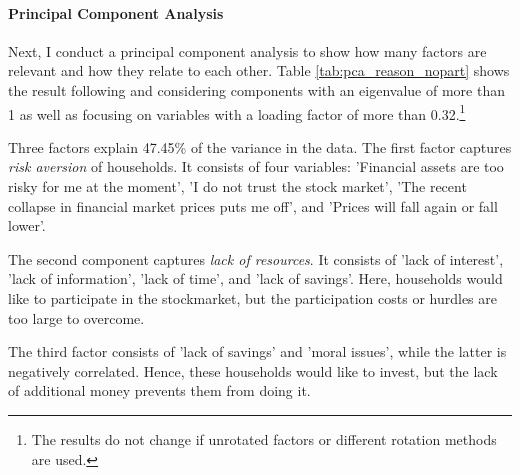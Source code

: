 \documentclass[ProjectABM]{subfiles}
\begin{document}


\paragraph{Principal Component Analysis}

Next, I conduct a principal component analysis to show how many factors are relevant and how they relate to each other. Table \ref{tab:pca_reason_nopart} shows the result following \cite{choi_2020} and\cite{tabachnick_fidell_2007} considering components with an eigenvalue of more than 1 as well as focusing on variables with a loading factor of more than 0.32.\footnote{The results do not change if unrotated factors or different rotation methods are used.}

Three factors explain 47.45\% of the variance in the data. The first factor captures \textit{risk aversion} of households. It consists of four variables: 'Financial assets are too risky for me at the moment', 'I do not trust the stock market', 'The recent collapse in financial market prices puts me off', and 'Prices will fall again or fall lower'. 

The second component captures \textit{lack of resources}. It consists of 'lack of interest', 'lack of information', 'lack of time', and 'lack of savings'. Here, households would like to participate in the stockmarket, but the participation costs or hurdles are too large to overcome.

The third factor consists of 'lack of savings' and 'moral issues', while the latter is negatively correlated. Hence, these households would like to invest, but the lack of additional money prevents them from doing it.
\end{document}
